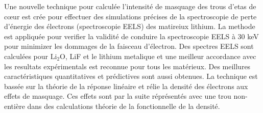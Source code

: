\documentclass[12pt]{report}
\begin{document}
Une nouvelle technique pour calcul\'ee l'intensit\'e de masquage des trous d'etas de c\oe ur est cr\'ee pour effectuer des simulations pr\'ecises de la spectroscopie de perte d'\'energie des \'electrons (spectroscopie EELS) des matireiux lithium. La methode est appliqu\'ee pour verifier la validit\'e de conduire la spectroscopie EELS \`a 30 keV pour minimizer les dommages de la faisceau d'\'electron. Des spectres EELS sont calcul\'ees pour $ \mathrm{Li_2O} $, LiF et le lithium metalique et une meilleur accordance avec les resultats exp\'erimentals est reconnue pour tous les mat\'erieux.  Des meillures caract\'eristiques quantitatives et pr\'edictives sont aussi obtenues.   La technique est bass\'ee sur la th\'eorie de la r\'eponse lin\'eaire et r\'elie la densit\'e des \'electrons aux effets de masquage.  Ces effets sont par la suite r\'epr\'esent\'es avec une trou non-enti\`ere dans des calculations th\'eorie de la fonctionnelle de la densit\'e. 
\end{document}

